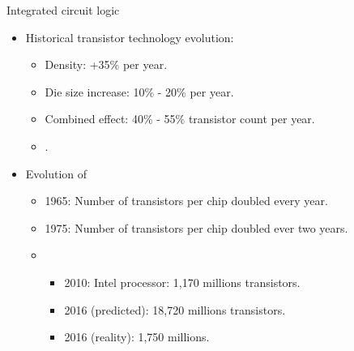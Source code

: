 \begin{frame}[t]{Integrated circuit logic}
\begin{itemize}
  \item Historical transistor technology evolution:
    \begin{itemize}
      \item Density: +35\% per year.
      \item Die size increase: 10\% - 20\% per year.
      \item Combined effect: 40\% - 55\% transistor count per year.
      \item {}.
    \end{itemize}

  \item Evolution of 
    \begin{itemize}
      \item 1965: Number of transistors per chip doubled every year.
      \item 1975: Number of transistors per chip doubled ever two years.
      \item {}
        \begin{itemize}
          \item 2010: Intel processor: 1,170 millions transistors.
          \item 2016 (predicted): 18,720 millions transistors.
          \item 2016 (reality): 1,750 millions.
        \end{itemize}
    \end{itemize}
\end{itemize}
\end{frame}

